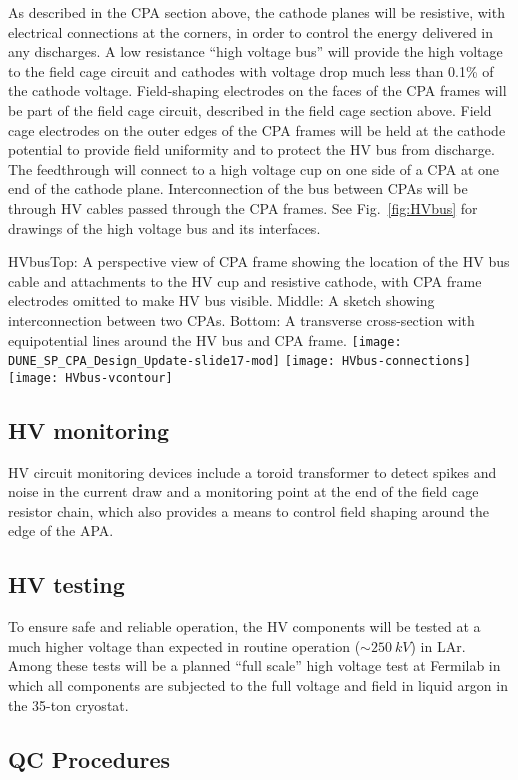 As described in the CPA section above, the cathode planes will be
resistive, with electrical connections at the corners, in order to
control the energy delivered in any discharges.  A low resistance
``high voltage bus'' will provide the high voltage to the field cage
circuit and cathodes with voltage drop much less than 0.1\% of the
cathode voltage.  Field-shaping electrodes on the faces of the CPA
frames will be part of the field cage circuit, described in the field
cage section above. Field cage electrodes on the outer edges of the
CPA frames will be held at the cathode potential to provide field
uniformity and to protect the HV bus from discharge.  The feedthrough
will connect to a high voltage cup on one side of a CPA at one end of
the cathode plane.  Interconnection of the bus between CPAs will be
through HV cables passed through the CPA frames.  See
Fig.~\ref{fig:HVbus} for drawings of the high voltage bus and its
interfaces.

\begin{cdrfigure}{HVbus}{Top: A perspective view of CPA frame showing the location of the HV bus cable and attachments to the HV cup and resistive cathode, with CPA frame electrodes omitted to make HV bus visible. Middle: A sketch showing interconnection between two CPAs. Bottom: A transverse cross-section with equipotential lines around the HV bus and CPA frame.}
\texttt{[image: DUNE\_SP\_CPA\_Design\_Update-slide17-mod]}
\texttt{[image: HVbus-connections]}
\texttt{[image: HVbus-vcontour]}
\end{cdrfigure}

\subsection{HV monitoring}

HV circuit monitoring devices include a toroid transformer to detect
spikes and noise in the current draw and a monitoring point at the end
of the field cage resistor chain, which also provides a means to
control field shaping around the edge of the
APA.

\subsection{HV testing}

To ensure safe and reliable operation, the HV components will be
tested at a much higher voltage than expected in routine operation
($\sim\SI{250}{kV}$) in LAr. Among these tests will be a planned
``full scale'' high voltage test at Fermilab in which all components
are subjected to the full voltage and field in liquid argon in the
35-ton cryostat.

\subsection{QC Procedures}

